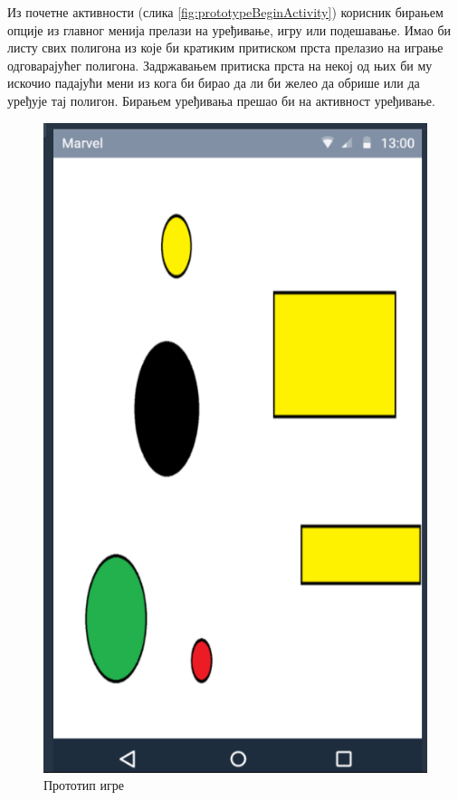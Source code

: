  Из почетне активности (слика \ref{fig:prototypeBeginActivity}) корисник бирањем опције из главног менија прелази на уређивање, игру или подешавање. Имао би листу свих полигона из које би кратиким притиском прста прелазио на играње одговарајућег полигона. Задржавањем притиска прста на некој од њих би му искочио падајући мени из кога би бирао да ли би желео да обрише или да уређује тај полигон. Бирањем уређивања прешао би на активност уређивање. 

\begin{figure}[htb!]
\begin{center}
\includegraphics[scale=.5]{pictures/prototype/gameActivity}
\caption{Прототип игре}\label{fig:prototypeGameActivity}
\end{center}
\end{figure}

